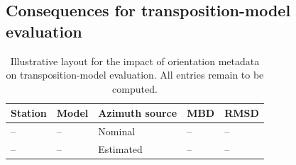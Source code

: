 
\subsection{Consequences for transposition-model evaluation}
\label{subsec:transpositionresults}
\begin{table}[t]
\centering
\caption{Illustrative layout for the impact of orientation metadata on
transposition-model evaluation. All entries remain to be computed.}
\label{tab:transposition}
\begin{tabular}{lllll}
\toprule
Station & Model & Azimuth source & MBD & RMSD \\
\midrule
-- & -- & Nominal & -- & -- \\
-- & -- & Estimated & -- & -- \\
\bottomrule
\end{tabular}
\end{table}
